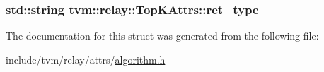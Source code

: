 \subsubsection[{\texorpdfstring{ret\+\_\+type}{ret_type}}]{\setlength{\rightskip}{0pt plus 5cm}std\+::string tvm\+::relay\+::\+Top\+K\+Attrs\+::ret\+\_\+type}\hypertarget{structtvm_1_1relay_1_1TopKAttrs_a5717dfe7edcd2817fc35b2e84dc2305d}{}\label{structtvm_1_1relay_1_1TopKAttrs_a5717dfe7edcd2817fc35b2e84dc2305d}


The documentation for this struct was generated from the following file\+:\begin{DoxyCompactItemize}
\item 
include/tvm/relay/attrs/\hyperlink{algorithm_8h}{algorithm.\+h}\end{DoxyCompactItemize}
